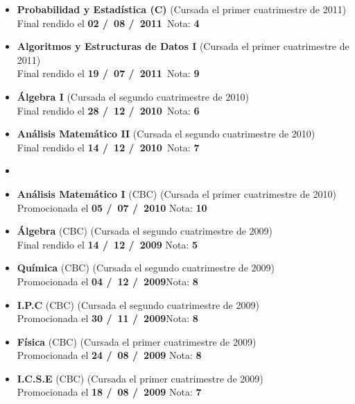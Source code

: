 \begin{itemize}[leftmargin=0.8cm]
  \item{\textbf{Probabilidad y Estadística (C)} (Cursada el primer cuatrimestre de 2011)\\
  Final rendido el \textbf{02 \slash \ 08 \slash \ 2011}\  \hfill Nota: \textbf{4}}

  \item{\textbf{Algoritmos y Estructuras de Datos I} (Cursada el primer cuatrimestre de 2011)\\
  Final rendido el \textbf{19 \slash \ 07 \slash \ 2011}\  \hfill Nota: \textbf{9}}

  \item{\textbf{Álgebra I} (Cursada el segundo cuatrimestre de 2010)\\
  Final rendido el \textbf{28 \slash \ 12 \slash \ 2010}\  \hfill Nota: \textbf{6}}

  \item{\textbf{Análisis Matemático II} (Cursada el segundo cuatrimestre de 2010)\\
  Final rendido el \textbf{14 \slash \ 12 \slash \ 2010}\  \hfill Nota: \textbf{7}}

  \item[] %

  \item{\textbf{Análisis Matemático I} (CBC) (Cursada el primer cuatrimestre de 2010)\\
  Promocionada el \textbf{05 \slash \ 07 \slash \ 2010} \hfill Nota: \textbf{10}}

  \item{\textbf{Álgebra} (CBC) (Cursada el segundo cuatrimestre de 2009)\\
  Final rendido el \textbf{14 \slash \ 12 \slash \ 2009} \hfill Nota: \textbf{5}}

  \item{\textbf{Química} (CBC) (Cursada el segundo cuatrimestre de 2009)\\
  Promocionada el \textbf{04 \slash \ 12 \slash \ 2009}\hfill Nota: \textbf{8}}

  \item{\textbf{I.P.C} (CBC) (Cursada el segundo cuatrimestre de 2009)\\
  Promocionada el \textbf{30 \slash \ 11 \slash \ 2009}\hfill Nota: \textbf{8}}

  \item{\textbf{Física} (CBC) (Cursada el primer cuatrimestre de 2009)\\
  Promocionada el \textbf{24 \slash \ 08 \slash \ 2009} \hfill Nota: \textbf{8}}

  \item{\textbf{I.C.S.E} (CBC) (Cursada el primer cuatrimestre de 2009)\\
  Promocionada el \textbf{18 \slash \ 08 \slash \ 2009} \hfill Nota: \textbf{7}}

\end{itemize}

